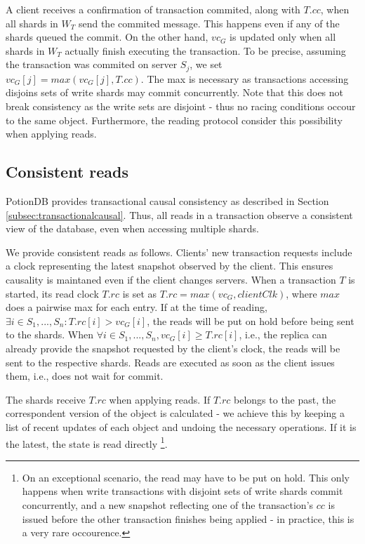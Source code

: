 \documentclass{vldb}
\begin{document}
A client receives a confirmation of transaction commited, along with $T.cc$, when all shards in $W_T$ send the commited message.
This happens even if any of the shards queued the commit.
On the other hand, $vc_G$ is updated only when all shards in $W_T$ actually finish executing the transaction.
To be precise, assuming the transaction was commited on server $S_j$, we set $vc_G[j] = max(vc_G[j], T.cc)$.
The max is necessary as transactions accessing disjoins sets of write shards may commit concurrently.
Note that this does not break consistency as the write sets are disjoint - thus no racing conditions occour to the same object.
Furthermore, the reading protocol consider this possibility when applying reads.

\subsection{Consistent reads}
\label{subsec:consistentReads}
PotionDB provides transactional causal consistency as described in Section \ref{subsec:transactionalcausal}.
Thus, all reads in a transaction observe a consistent view of the database, even when accessing multiple shards.

We provide consistent reads as follows.
Clients' new transaction requests include a clock representing the latest snapshot observed by the client. %
This ensures causality is maintaned even if the client changes servers.
When a transaction $T$ is started, its read clock $T.rc$ is set as $T.rc = max(vc_G, clientClk)$, where $max$ does a pairwise max for each entry.
If at the time of reading, $\exists i \in S_1, ..., S_n : T.rc[i] > vc_G[i]$, the reads will be put on hold before being sent to the shards. 
When $\forall i \in S_1, ..., S_n, vc_G[i] \geq T.rc[i]$, i.e., the replica can already provide the snapshot requested by the client's clock, the reads will be sent to the respective shards.
Reads are executed as soon as the client issues them, i.e., does not wait for commit. %

The shards receive $T.rc$ when applying reads.
If $T.rc$ belongs to the past, the correspondent version of the object is calculated - we achieve this by keeping a list of recent updates of each object and undoing the necessary operations. %
If it is the latest, the state is read directly \footnote{On an exceptional scenario, the read may have to be put on hold. This only happens when write transactions with disjoint sets of write shards commit concurrently, and a new snapshot reflecting one of the transaction's $cc$ is issued before the other transaction finishes being applied - in practice, this is a very rare occourence.}.
\end{document}
